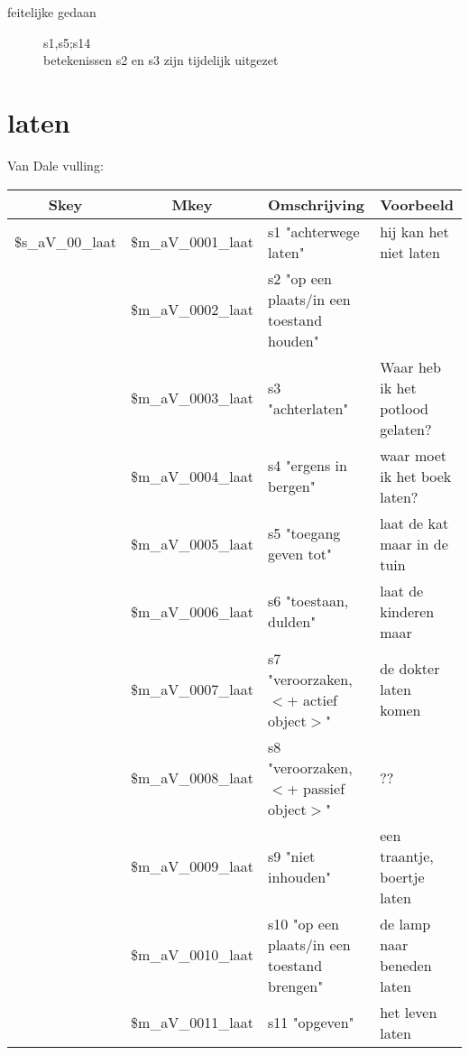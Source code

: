 \begin{description}
\item[feitelijke gedaan] s1,s5;s14\\
betekenissen s2 en s3 zijn tijdelijk uitgezet
\end{description}


\newpage
\section{laten}

Van Dale vulling:\\
\begin{tabular}[t]{|c|c|p{}|p{}|}
\hline
Skey          & Mkey              & Omschrijving & Voorbeeld\\
\hline
\$s\_aV\_00\_laat & \$m\_aV\_0001\_laat   & s1 "achterwege laten" & hij kan het niet
                                                             laten\\
              & \$m\_aV\_0002\_laat   & s2 "op een plaats/in een toestand houden"&
                                          \\
              & \$m\_aV\_0003\_laat   & s3 "achterlaten" & Waar heb ik het
                                                        potlood gelaten?\\
              & \$m\_aV\_0004\_laat   & s4 "ergens in bergen" & waar moet ik het
                                                             boek laten?\\
              & \$m\_aV\_0005\_laat   & s5 "toegang geven tot" & laat de kat
                                                              maar in de tuin\\
              & \$m\_aV\_0006\_laat   & s6 "toestaan, dulden"  & laat de kinderen
                                                               maar\\
              & \$m\_aV\_0007\_laat   & s7 "veroorzaken, $<$+ actief object$>$"  & de dokter laten komen\\
              & \$m\_aV\_0008\_laat   & s8 "veroorzaken, $<$+ passief object$>$" & ??\\
              & \$m\_aV\_0009\_laat   & s9 "niet inhouden" & een traantje, boertje   laten\\
              & \$m\_aV\_0010\_laat   & s10 "op een plaats/in een toestand brengen" & de lamp naar beneden laten\\
              & \$m\_aV\_0011\_laat   & s11 "opgeven" & het leven laten\\

\end{tabular}
